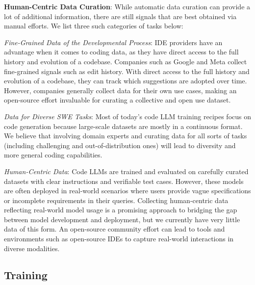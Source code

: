 \textbf{Human-Centric Data Curation}: While automatic data curation can provide a lot of additional information, there are still signals that are best obtained via manual efforts. We list three such categories of tasks below:

\textit{Fine-Grained Data of the Developmental Process}: IDE providers have an advantage when it comes to coding data, as they have direct access to the full history and evolution of a codebase. Companies such as Google and Meta \citep{chandra2024ai, murali2024ai} collect fine-grained signals such as edit history. With direct access to the full history and evolution of a codebase, they can track which suggestions are adopted over time. However, companies generally collect data for their own use cases, making an open-source effort invaluable for curating a collective and open use dataset.

\textit{Data for Diverse SWE Tasks}: Most of today's code LLM training recipes focus on code generation because large-scale datasets are mostly in a continuous format. We believe that involving domain experts and curating data for all sorts of tasks (including challenging and out-of-distribution ones) will lead to diversity and more general coding capabilities.

\textit{Human-Centric Data}: Code LLMs are trained and evaluated on carefully curated datasets with clear instructions and verifiable test cases. However, these models are often deployed in real-world scenarios where users provide vague specifications or incomplete requirements in their queries. Collecting human-centric data reflecting real-world model usage is a promising approach to bridging the gap between model development and deployment, but we currently have very little data of this form. An open-source community effort can lead to tools and environments such as open-source IDEs to capture real-world interactions in diverse modalities.

\subsection{Training}

